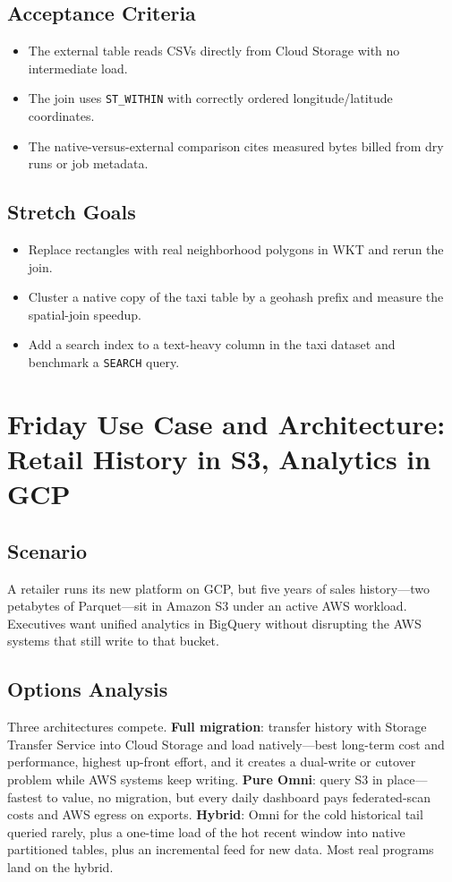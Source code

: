 \subsection*{Acceptance Criteria}
\begin{itemize}
    \item The external table reads CSVs directly from Cloud Storage with no intermediate load.
    \item The join uses \texttt{ST\_WITHIN} with correctly ordered longitude/latitude coordinates.
    \item The native-versus-external comparison cites measured bytes billed from dry runs or job metadata.
\end{itemize}

\subsection*{Stretch Goals}
\begin{itemize}
    \item Replace rectangles with real neighborhood polygons in WKT and rerun the join.
    \item Cluster a native copy of the taxi table by a geohash prefix and measure the spatial-join speedup.
    \item Add a search index to a text-heavy column in the taxi dataset and benchmark a \texttt{SEARCH} query.
\end{itemize}

\section{Friday Use Case and Architecture: Retail History in S3, Analytics in GCP}

\subsection{Scenario}
A retailer runs its new platform on GCP, but five years of sales history---two petabytes of Parquet---sit in Amazon S3 under an active AWS workload. Executives want unified analytics in BigQuery without disrupting the AWS systems that still write to that bucket.

\subsection{Options Analysis}
Three architectures compete. \textbf{Full migration}: transfer history with Storage Transfer Service into Cloud Storage and load natively---best long-term cost and performance, highest up-front effort, and it creates a dual-write or cutover problem while AWS systems keep writing. \textbf{Pure Omni}: query S3 in place---fastest to value, no migration, but every daily dashboard pays federated-scan costs and AWS egress on exports. \textbf{Hybrid}: Omni for the cold historical tail queried rarely, plus a one-time load of the hot recent window into native partitioned tables, plus an incremental feed for new data. Most real programs land on the hybrid.

